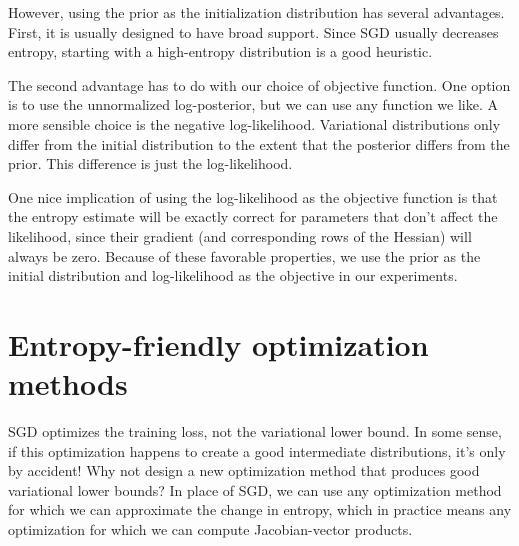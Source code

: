 \documentclass[]{article}
\begin{document}
However, using the prior as the initialization distribution has several advantages.
First, it is usually designed to have broad support.
Since SGD usually decreases entropy, starting with a high-entropy distribution is a good heuristic.

The second advantage has to do with our choice of objective function.
One option is to use the unnormalized log-posterior, but we can use any function we like.
A more sensible choice is the negative log-likelihood.
Variational distributions only differ from the initial distribution to the extent that the posterior differs from the prior.
This difference is just the log-likelihood.

One nice implication of using the log-likelihood as the objective function is that the entropy estimate will be exactly correct for parameters that don't affect the likelihood, since their gradient (and corresponding rows of the Hessian) will always be zero.
Because of these favorable properties, we use the prior as the initial distribution and log-likelihood as the objective in our experiments.

\section{Entropy-friendly optimization methods}
\label{sec:entropy friendly}
SGD optimizes the training loss, not the variational lower bound.
In some sense, if this optimization happens to create a good intermediate distributions, it's only by accident!
Why not design a new optimization method that produces good variational lower bounds?
In place of SGD, we can use any optimization method for which we can approximate the change in entropy, which in practice means any optimization for which we can compute Jacobian-vector products.
\end{document}
